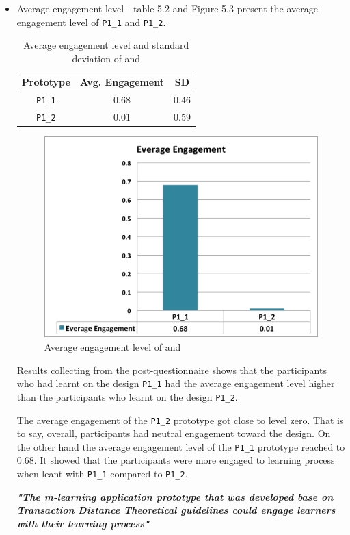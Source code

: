 \begin{itemize} 
\item Average engagement level - table 5.2 and Figure 5.3 present the average engagement level of \verb|P1_1| and \verb|P1_2|. 

\begin{table}[H]
\centering
\caption{Average engagement level and standard deviation of  and }
\begin{tabular}{|c|c|c|} \hline
 Prototype & Avg. Engagement & SD \\
\hline
\verb|P1_1|& 0.68 & 0.46 \\
\hline 
\verb|P1_2|& 0.01 & 0.59 \\
\hline
\end{tabular}
\end{table}

\begin{figure}[H]
\centering
\includegraphics[width=0.6 \textwidth]{r11}
\caption{Average engagement level of  and }
\end{figure}


Results collecting from the post-questionnaire shows that  the participants who had learnt on the design \verb|P1_1| had the average engagement level higher than the participants who learnt on the design \verb|P1_2|.

The average engagement of the \verb|P1_2| prototype got close to level zero. That is to say, overall, participants had neutral engagement toward the design. On the other hand the average engagement level of the \verb|P1_1| prototype reached to 0.68. It showed that the participants were more engaged to learning process when leant with \verb|P1_1| compared to \verb|P1_2|. 
\newline 
\begin{addmargin}[1.5em]{1.5em}
\textit{\textbf{"The m-learning application prototype that was developed base on Transaction Distance Theoretical guidelines could engage learners with their learning process"}} 
\end{addmargin}


\end{itemize}
